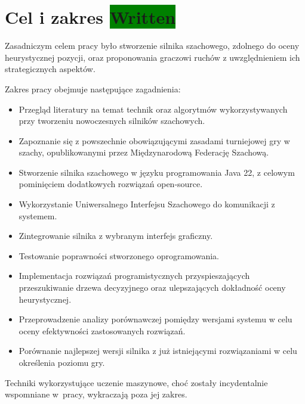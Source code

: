 \section{Cel i zakres \colorbox{green}{Written}}
\label{sec:cel-i-zakres}

Zasadniczym celem pracy było stworzenie silnika szachowego, zdolnego do oceny heurystycznej pozycji, oraz proponowania graczowi ruchów z uwzględnieniem ich strategicznych aspektów.

Zakres pracy obejmuje następujące zagadnienia:
\begin{itemize}
    \item Przegląd literatury na temat technik oraz algorytmów wykorzystywanych przy tworzeniu nowoczesnych silników szachowych.
    \item Zapoznanie się z powszechnie obowiązującymi zasadami turniejowej gry w szachy, opublikowanymi przez Międzynarodową Federację Szachową.
    \item Stworzenie silnika szachowego w języku programowania Java 22, z celowym pominięciem dodatkowych rozwiązań open-source.
    \item Wykorzystanie Uniwersalnego Interfejsu Szachowego do komunikacji z systemem.
    \item Zintegrowanie silnika z wybranym interfejs graficzny.
    \item Testowanie poprawności stworzonego oprogramowania.
    \item Implementacja rozwiązań programistycznych przyspieszających przeszukiwanie drzewa decyzyjnego oraz ulepszających dokładność oceny heurystycznej.
    \item Przeprowadzenie analizy porównawczej pomiędzy wersjami systemu w celu oceny efektywności zastosowanych rozwiązań.
    \item Porównanie najlepszej wersji silnika z już istniejącymi rozwiązaniami w celu określenia poziomu gry.
\end{itemize}

Techniki wykorzystujące uczenie maszynowe, choć zostały incydentalnie wspomniane w~pracy, wykraczają poza jej zakres.

